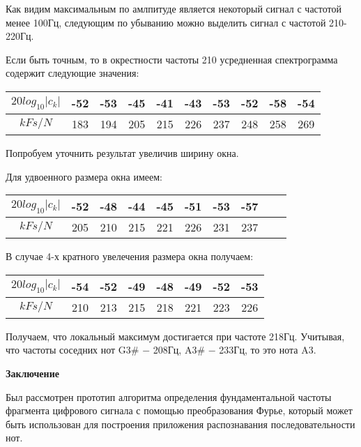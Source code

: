 \documentclass[oneside, final, 14pt]{extarticle}
\begin{document}
  Как видим максимальным по амлпитуде является некоторый сигнал с частотой
  менее 100Гц, следующим по убыванию можно выделить сигнал с частотой
  210-220Гц.

  Если быть точным, то в окрестности частоты 210 усредненная спектрограмма
  содержит следующие значения:

  \begin{tabular}[t]{|c|c|c|c|c|c|c|c|c|c|}
    \hline
    $20 log_{10}|c_k|$ & -52 & -53 & -45
      & -41 & -43 & -53 & -52 & -58 & -54 \\
    \hline
    $k Fs/N$ & 183 & 194 & 205
      & 215 & 226 & 237 & 248 & 258 & 269 \\
    \hline
  \end{tabular}

  Попробуем уточнить результат увеличив ширину окна.

  Для удвоенного размера окна имеем:

  \begin{tabular}[t]{|c|c|c|c|c|c|c|c|c|c|}
    \hline
    $20 log_{10}|c_k|$ & -52 & -48 & -44 & -45 & -51 & -53 & -57 \\
    \hline
    $k Fs/N$ & 205 & 210 & 215 & 221 & 226 & 231 & 237 \\
    \hline
  \end{tabular}

  В случае 4-х кратного увелечения размера окна получаем:

  \begin{tabular}[t]{|c|c|c|c|c|c|c|c|}
    \hline
    $20 log_{10}|c_k|$ & -54 & -52 & -49 & -48 & -49 & -52 & -53 \\
    \hline
    $k Fs/N$ & 210 & 213 & 215 & 218 & 221 & 223 & 226 \\
    \hline
  \end{tabular}


  Получаем, что локальный максимум достигается при частоте 218Гц. Учитывая,
  что частоты соседних нот G3\# $-$ 208Гц, A3\# $-$ 233Гц, то это нота A3.

\cleardoublepage

{\large \bf Заключение \\}
  Был рассмотрен прототип алгоритма определения фундаментальной частоты
  фрагмента цифрового сигнала с помощью преобразования Фурье, который может
  быть использован для построения приложения распознавания последовательности
  нот.
\end{document}
